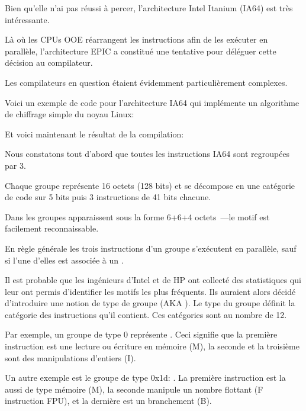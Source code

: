 ﻿
\label{itanium}

Bien qu'elle n'ai pas réussi à percer, l'architecture  Intel Itanium (\ac{IA64}) est très intéressante.

Là où les CPUs \ac{OOE} réarrangent les instructions afin de les exécuter en parallèle, l'architecture
\ac{EPIC} a constitué une tentative pour déléguer cette décision au compilateur.

Les compilateurs en question étaient évidemment particulièrement complexes.

Voici un exemple de code pour l'architecture \ac{IA64} qui implémente un algorithme de
chiffrage simple du noyau Linux:



Et voici maintenant le résultat de la compilation:



Nous constatons tout d'abord que toutes les instructions \ac{IA64} sont regroupées par 3.

Chaque groupe représente 16 octets (128 bits) et se décompose en une catégorie de code sur 5 bits
puis 3 instructions de 41 bits chacune.

Dans \IDA les groupes apparaissent sous la forme 6+6+4 octets~---le motif est facilement
reconnaissable.

En règle générale les trois instructions d'un groupe s'exécutent en parallèle, sauf si l'une d'elles
est associée à un .

Il est probable que les ingénieurs d'Intel et de HP ont collecté des statistiques qui leur ont permis
d'identifier les motifs les plus fréquents. Ils auraient alors décidé d'introduire une notion de
type de groupe (\ac{AKA} ). Le type du groupe définit la catégorie des instructions
qu'il contient. Ces catégories sont au nombre de 12.

Par exemple, un groupe de type 0 représente . Ceci signifie que la première instruction est
une lecture ou écriture en mémoire (M), la seconde et la troisième sont des manipulations d'entiers
(I).

Un autre exemple est le groupe de type 0x1d: . La première instruction est la aussi de type
mémoire (M), la seconde manipule un nombre flottant (F instruction \ac{FPU}), et la dernière est un
branchement (B).

